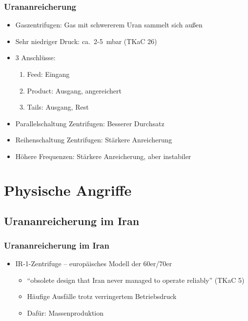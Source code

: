 \documentclass{beamer}
\begin{document}
\begin{frame}
  \frametitle{Urananreicherung}
  \begin{itemize}
    \item Gaszentrifugen: Gas mit schwererem Uran sammelt sich außen
    \item Sehr niedriger Druck: ca.~2-5~mbar (TKaC 26)
    \item 3 Anschlüsse:
      \begin{enumerate}
        \item Feed: Eingang
        \item Product: Ausgang, angereichert
        \item Tails: Ausgang, Rest
      \end{enumerate}
    \item Parallelschaltung Zentrifugen: Besserer Durchsatz
    \item Reihenschaltung Zentrifugen: Stärkere Anreicherung
    \item Höhere Frequenzen: Stärkere Anreicherung, aber instabiler
  \end{itemize}
\end{frame}

\section{Physische Angriffe}

\subsection{Urananreicherung im Iran}

\begin{frame}
  \frametitle{Urananreicherung im Iran}
  \begin{itemize}
    \item IR-1-Zentrifuge – europäisches Modell der 60er/70er
      \begin{itemize}
        \item ``obsolete design that Iran never managed to operate reliably'' (TKaC 5)
        \item Häufige Ausfälle trotz verringertem Betriebsdruck
        \item Dafür: Massenproduktion
      \end{itemize}
  \end{itemize}
\end{frame}
\end{document}
